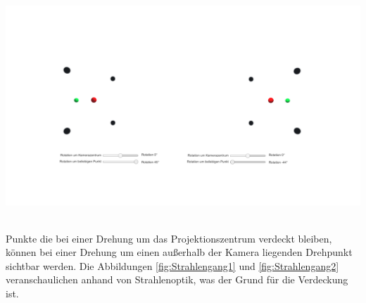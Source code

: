 \begin{minipage}{\linewidth}
	\centering
	\includegraphics[width=1.\linewidth]{images/DrehungDZ.png}
	\label{fig:DrehungDrehpunkt}
\end{minipage}\\ 

Punkte die bei einer Drehung um das Projektionszentrum verdeckt bleiben, können bei einer Drehung um einen außerhalb der Kamera liegenden Drehpunkt sichtbar werden. Die Abbildungen \ref{fig:Strahlengang1} und \ref{fig:Strahlengang2} veranschaulichen anhand von Strahlenoptik, was der Grund für die Verdeckung ist. \\


